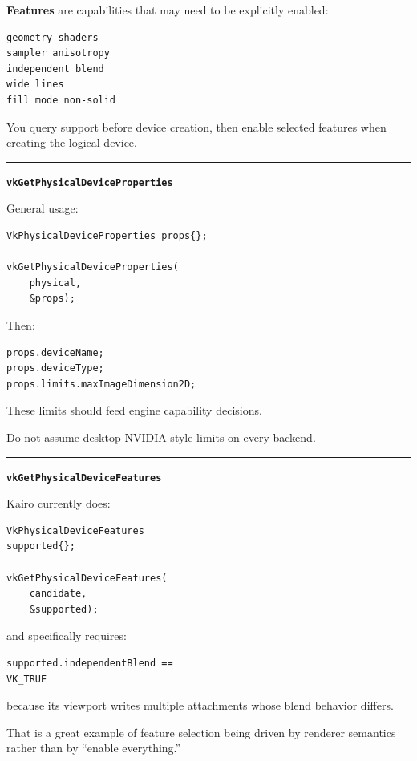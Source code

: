 \textbf{Features} are capabilities that may need to be explicitly enabled:

\begin{verbatim}
geometry shaders
sampler anisotropy
independent blend
wide lines
fill mode non-solid
\end{verbatim}

You query support before device creation, then enable selected features when creating the logical device.

\begin{center}\rule{0.5\linewidth}{0.5pt}\end{center}

\textbf{\texttt{vkGetPhysicalDeviceProperties}}

General usage:

\begin{verbatim}
VkPhysicalDeviceProperties props{};

vkGetPhysicalDeviceProperties(
    physical,
    &props);
\end{verbatim}

Then:

\begin{verbatim}
props.deviceName;
props.deviceType;
props.limits.maxImageDimension2D;
\end{verbatim}

These limits should feed engine capability decisions.

Do not assume desktop-NVIDIA-style limits on every backend.

\begin{center}\rule{0.5\linewidth}{0.5pt}\end{center}

\textbf{\texttt{vkGetPhysicalDeviceFeatures}}

Kairo currently does:

\begin{verbatim}
VkPhysicalDeviceFeatures
supported{};

vkGetPhysicalDeviceFeatures(
    candidate,
    &supported);
\end{verbatim}

and specifically requires:

\begin{verbatim}
supported.independentBlend ==
VK_TRUE
\end{verbatim}

because its viewport writes multiple attachments whose blend behavior differs.

That is a great example of feature selection being driven by renderer semantics rather than by ``enable everything.''


